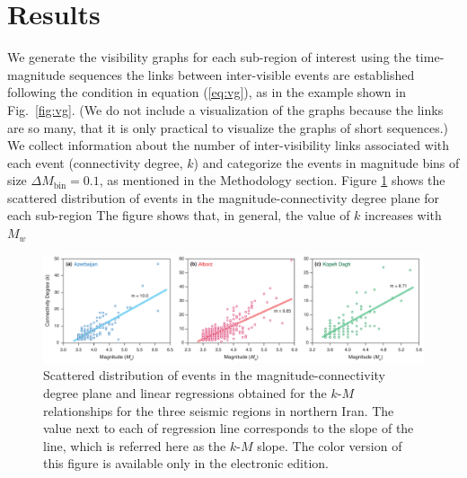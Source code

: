 
\section{Results}

We generate the visibility graphs for each sub-region of interest using the time-magnitude sequences  the links between inter-visible events are established following the condition in equation (\ref{eq:vg}), as in the example shown in Fig.~\ref{fig:vg}. (We do not include a visualization of the graphs because the links are so many, that it is only practical to visualize the graphs of short sequences.) We collect information about the number of inter-visibility links associated with each event (connectivity degree, $k$) and categorize the events in magnitude bins of size $\Delta M_{\mathrm{bin}} = 0.1$, as mentioned in the Methodology section. Figure \ref{fig:km} shows the scattered distribution of events in the magnitude-connectivity degree plane for each sub-region The figure shows that, in general, the value of $k$ increases with $M_w$

\begin{figure}[t]
	\centering
	\includegraphics[width=\textwidth]{figures/pdf/figure-06} 
	\caption{Scattered distribution of events in the magnitude-connectivity degree plane and linear regressions obtained for the $k$-$M$ relationships for the three seismic regions in northern Iran. The value next to each of regression line corresponds to the slope of the line, which is referred here as the $k$-$M$ slope. The color version of this figure is available only in the electronic edition.}
	\label{fig:km}
\end{figure}

